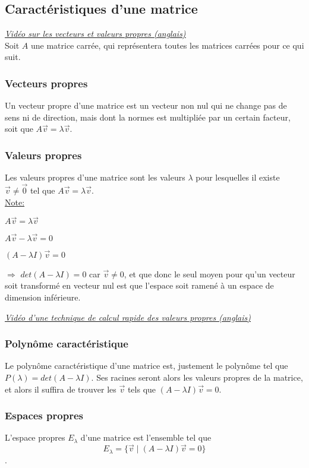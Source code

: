 \documentclass{article}
\begin{document}
\subsection{Caractéristiques d'une matrice}
\href{https://youtu.be/PFDu9oVAE-g}{\underline{\textit{Vidéo sur les vecteurs et valeurs propres (anglais)}}}\\
\break
Soit $A$ une matrice carrée, qui représentera toutes les matrices carrées pour ce qui suit.
\subsubsection{Vecteurs propres}
Un vecteur propre d'une matrice est un vecteur non nul qui ne change pas de sens ni de direction, mais dont la normes est multipliée par un certain facteur, soit que $A\Vec{v} = \lambda \Vec{v}$.
\subsubsection{Valeurs propres}
Les valeurs propres d'une matrice sont les valeurs $\lambda$ pour lesquelles il existe $\Vec{v} \ne \Vec{0}$ tel que $A\Vec{v} = \lambda \Vec{v}$.\\
\underline{Note:}
\begin{impl}
	\item[] $A\Vec{v} = \lambda \Vec{v}$
	\item $A\Vec{v} - \lambda \Vec{v} = 0$
	\item $(A - \lambda I)\Vec{v} = 0$
	\item[$\Rightarrow$] $det(A - \lambda I) = 0$ car $\Vec{v} \ne 0$, et que donc le seul moyen pour qu'un vecteur soit transformé en vecteur nul est que l'espace soit ramené à un espace de dimension inférieure.
\end{impl}
\break
\href{https://youtu.be/e50Bj7jn9IQ}{\underline{\textit{Vidéo d'une technique de calcul rapide des valeurs propres (anglais)}}}
\subsubsection{Polynôme caractéristique}
Le polynôme caractéristique d'une matrice est, justement le polynôme tel que $P(\lambda) = det(A - \lambda I)$. Ses racines seront alors les valeurs propres de la matrice, et alors il suffira de trouver les $\Vec{v}$ tels que $(A - \lambda I)\Vec{v} = 0$.
\subsubsection{Espaces propres}
L'espace propres $E_\lambda$ d'une matrice est l'ensemble tel que $$E_\lambda = \{ \Vec{v} \mid (A - \lambda I)\Vec{v} = 0 \}$$.
\end{document}
